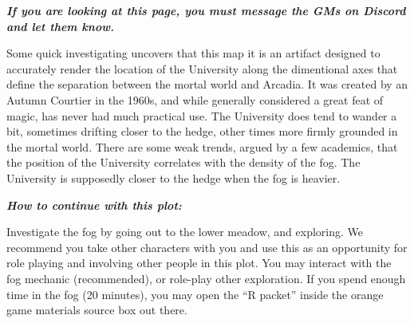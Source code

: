 \documentclass[green]{gl2018}
\begin{document}
\name{\gInvestigateTheMap{}}



\emph{{\bf If you are looking at this page, you must message the GMs on Discord and let them know.}}

Some quick investigating uncovers that this map it is an artifact designed to accurately render the location of the University along the dimentional axes that define the separation between the mortal world and Arcadia. It was created by an Autumn Courtier in the 1960s, and while generally considered a great feat of magic, has never had much practical use. The University does tend to wander a bit, sometimes drifting closer to the hedge, other times more firmly grounded in the mortal world. There are some weak trends, argued by a few academics, that the position of the University correlates with the density of the fog. The University is supposedly closer to the hedge when the fog is heavier.

\vspace{25px}
\emph{{\bf How to continue with this plot:}}
\begin{changemargin}{2cm}{2cm}
 Investigate the fog by going out to the lower meadow, and exploring. We recommend you take other characters with you and use this as an opportunity for role playing and involving other people in this plot. You may interact with the fog mechanic (recommended), or role-play other exploration. If you spend enough time in the fog (20 minutes), you may open the ``R packet'' inside the orange game materials source box out there.
\end{changemargin}
\end{document}
